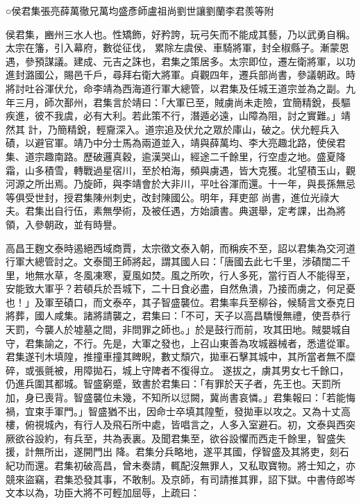 
\begin{pinyinscope}

 ○侯君集張亮薛萬徹兄萬均盛彥師盧祖尚劉世讓劉蘭李君羨等附



 侯君集，豳州三水人也。性矯飾，好矜誇，玩弓矢而不能成其藝，乃以武勇自稱。太宗在籓，引入幕府，數從征伐，
 累除左虞侯、車騎將軍，封全椒縣子。漸蒙恩遇，參預謀議。建成、元吉之誅也，君集之策居多。太宗即位，遷左衛將軍，以功進封潞國公，賜邑千戶，尋拜右衛大將軍。貞觀四年，遷兵部尚書，參議朝政。時將討吐谷渾伏允，命李靖為西海道行軍大總管，以君集及任城王道宗並為之副。九年三月，師次鄯州，君集言於靖曰：「大軍已至，賊虜尚未走險，宜簡精銳，長驅疾進，彼不我虞，必有大利。若此策不行，潛遁必遠，山障為阻，討之實難。」靖然其
 計，乃簡精銳，輕齎深入。道宗追及伏允之眾於庫山，破之。伏允輕兵入磧，以避官軍。靖乃中分士馬為兩道並入，靖與薛萬均、李大亮趣北路，使侯君集、道宗趣南路。歷破邏真穀，逾漢哭山，經途二千餘里，行空虛之地。盛夏降霜，山多積雪，轉戰過星宿川，至於柏海，頻與虜遇，皆大克獲。北望積玉山，觀河源之所出焉。乃旋師，與李靖會於大非川，平吐谷渾而還。十一年，與長孫無忌等俱受世封，授君集陳州刺史，改封陳國公。明年，拜吏部
 尚書，進位光祿大夫。君集出自行伍，素無學術，及被任遇，方始讀書。典選舉，定考課，出為將領，入參朝政，並有時譽。



 高昌王麴文泰時遏絕西域商賈，太宗徵文泰入朝，而稱疾不至，詔以君集為交河道行軍大總管討之。文泰聞王師將起，謂其國人曰：「唐國去此七千里，涉磧闊二千里，地無水草，冬風凍寒，夏風如焚。風之所吹，行人多死，當行百人不能得至，安能致大軍乎？若頓兵於吾城下，二十日食必盡，自然魚潰，乃接而虜之，何足憂
 也！」及軍至磧口，而文泰卒，其子智盛襲位。君集率兵至柳谷，候騎言文泰克日將葬，國人咸集。諸將請襲之，君集曰：「不可，天子以高昌驕慢無禮，使吾恭行天罰，今襲人於墟墓之間，非問罪之師也。」於是鼓行而前，攻其田地。賊嬰城自守，君集諭之，不行。先是，大軍之發也，上召山東善為攻城器械者，悉遣從軍。君集遂刊木填隍，推撞車撞其睥睨，數丈頹穴，拋車石擊其城中，其所當者無不糜碎，或張氈被，用障拋石，城上守陴者不復得立。
 遂拔之，虜其男女七千餘口，仍進兵圍其都城。智盛窮蹙，致書於君集曰：「有罪於天子者，先王也。天罰所加，身已喪背。智盛襲位未幾，不知所以愆闕，冀尚書哀憐。」君集報曰：「若能悔禍，宜束手軍門。」智盛猶不出，因命士卒填其隍塹，發拋車以攻之。又為十丈高樓，俯視城內，有行人及飛石所中處，皆唱言之，人多入室避石。初，文泰與西突厥欲谷設約，有兵至，共為表裏。及聞君集至，欲谷設懼而西走千餘里，智盛失援，計無所出，遂開門出
 降。君集分兵略地，遂平其國，俘智盛及其將吏，刻石紀功而還。君集初破高昌，曾未奏請，輒配沒無罪人，又私取寶物。將士知之，亦競來盜竊，君集恐發其事，不敢制。及京師，有司請推其罪，詔下獄。中書侍郎岑文本以為，功臣大將不可輕加屈辱，上疏曰：




\end{pinyinscope}
